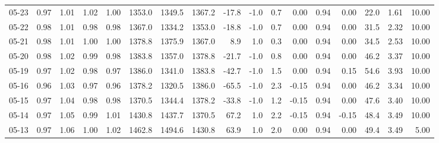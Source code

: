 \begin{threeparttable}
{\begin{tabular}{lrrrrrrrrrrrrrrrr}
  05-23 &         0.97 &           1.01 &          1.02 &          1.00 & 1353.0 & 1349.5 & 1367.2 &      -17.8 &                     -1.0 &                 0.7 &       0.00 &      0.94 &           0.00 &             22.0 &            1.61 &                  10.00 \\
  05-22 &         0.98 &           1.01 &          0.98 &          0.98 & 1367.0 & 1334.2 & 1353.0 &      -18.8 &                     -1.0 &                 0.7 &       0.00 &      0.94 &           0.00 &             31.5 &            2.32 &                  10.00 \\
  05-21 &         0.98 &           1.01 &          1.00 &          1.00 & 1378.8 & 1375.9 & 1367.0 &        8.9 &                      1.0 &                 0.3 &       0.00 &      0.94 &           0.00 &             34.5 &            2.53 &                  10.00 \\
  05-20 &         0.98 &           1.02 &          0.99 &          0.98 & 1383.8 & 1357.0 & 1378.8 &      -21.7 &                     -1.0 &                 0.8 &       0.00 &      0.94 &           0.00 &             46.2 &            3.37 &                  10.00 \\
  05-19 &         0.97 &           1.02 &          0.98 &          0.97 & 1386.0 & 1341.0 & 1383.8 &      -42.7 &                     -1.0 &                 1.5 &       0.00 &      0.94 &           0.15 &             54.6 &            3.93 &                  10.00 \\
  05-16 &         0.96 &           1.03 &          0.97 &          0.96 & 1378.2 & 1320.5 & 1386.0 &      -65.5 &                     -1.0 &                 2.3 &      -0.15 &      0.94 &           0.00 &             46.2 &            3.34 &                  10.00 \\
  05-15 &         0.97 &           1.04 &          0.98 &          0.98 & 1370.5 & 1344.4 & 1378.2 &      -33.8 &                     -1.0 &                 1.2 &      -0.15 &      0.94 &           0.00 &             47.6 &            3.40 &                  10.00 \\
  05-14 &         0.97 &           1.05 &          0.99 &          1.01 & 1430.8 & 1437.7 & 1370.5 &       67.2 &                      1.0 &                 2.2 &      -0.15 &      0.94 &          -0.15 &             48.4 &            3.49 &                  10.00 \\
  05-13 &         0.97 &           1.06 &          1.00 &          1.02 & 1462.8 & 1494.6 & 1430.8 &       63.9 &                      1.0 &                 2.0 &       0.00 &      0.94 &           0.00 &             49.4 &            3.49 &                   5.00 \\

\end{tabular}}
\end{threeparttable}
